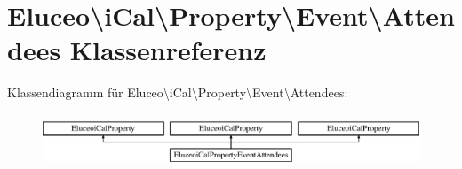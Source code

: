 \hypertarget{class_eluceo_1_1i_cal_1_1_property_1_1_event_1_1_attendees}{}\section{Eluceo\textbackslash{}i\+Cal\textbackslash{}Property\textbackslash{}Event\textbackslash{}Attendees Klassenreferenz}
\label{class_eluceo_1_1i_cal_1_1_property_1_1_event_1_1_attendees}
Klassendiagramm für Eluceo\textbackslash{}i\+Cal\textbackslash{}Property\textbackslash{}Event\textbackslash{}Attendees\+:\begin{figure}[H]
\begin{center}
\leavevmode
\includegraphics[height=1.595442cm]{class_eluceo_1_1i_cal_1_1_property_1_1_event_1_1_attendees}
\end{center}
\end{figure}
